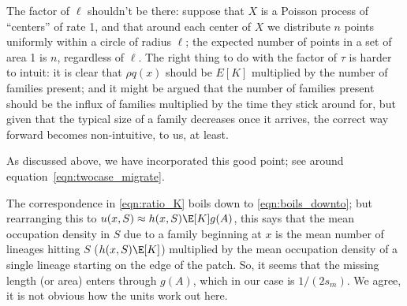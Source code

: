 \reply
The factor of $\ell$ shouldn't be there:
suppose that $X$ is a Poisson process of ``centers'' of rate 1, 
and that around each center of $X$ we distribute $n$ points uniformly within a circle of radius $\ell$;
the expected number of points in a set of area 1 is $n$, regardless of $\ell$.
The right thing to do with the factor of $\tau$ is harder to intuit:
it is clear that $\rho q(x)$ should be $E[K]$ multiplied by the number of families present;
and it might be argued that the number of families present should be the influx of families
multiplied by the time they stick around for,
but given that the typical size of a family decreases once it arrives,
the correct way forward becomes non-intuitive, to us, at least.


\reply
As discussed above, we have incorporated this good point; see around equation~\eqref{eqn:twocase_migrate}.


\reply
    The correspondence in \eqref{eqn:ratio_K} boils down to \eqref{eqn:boils_downto};
    but rearranging this to $u(x,S) \approx h(x,S) \E[K] g(A)$,
    this says that the mean occupation density in $S$ due to a family beginning at $x$
    is the mean number of lineages hitting $S$ ($h(x,S) \E[K]$)
    multiplied by the mean occupation density of a single lineage starting on the edge of the patch.
    So, it seems that the missing length (or area) enters through $g(A)$,
    which in our case is $1/(2s_m)$.
    We agree, it is not obvious how the units work out here.


